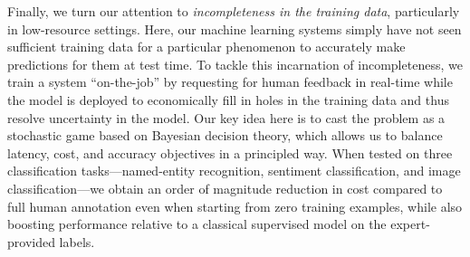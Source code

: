 Finally, we turn our attention to \textit{incompleteness in the training data}, particularly in low-resource settings.
Here, our machine learning systems simply have not seen sufficient training data for a particular phenomenon to accurately make predictions for them at test time. 
To tackle this incarnation of incompleteness, we train a system ``on-the-job'' by requesting for human feedback in real-time while the model is deployed to economically fill in holes in the training data and thus resolve uncertainty in the model.
Our key idea here is to cast the problem as a stochastic game based on Bayesian decision theory, which allows us to balance latency, cost, and accuracy objectives in a principled way.
When tested on three classification tasks---named-entity recognition, sentiment classification, and image classification---we obtain an order of magnitude reduction in cost compared to full human annotation even when starting from zero training examples, while also boosting performance relative to a classical supervised model on the expert-provided labels.
